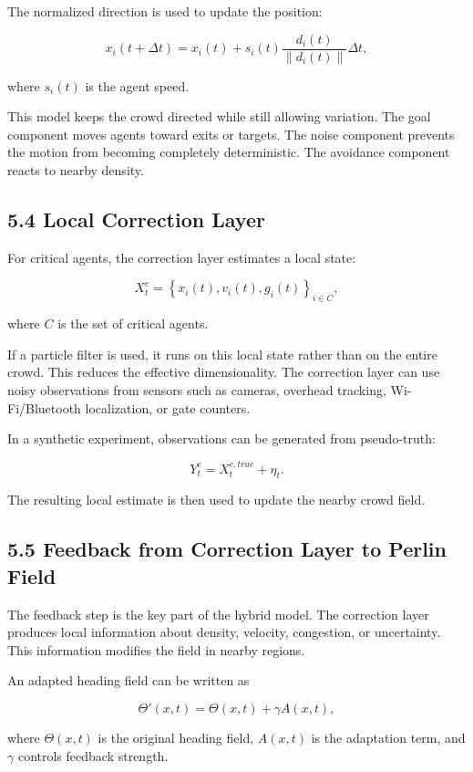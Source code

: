 \documentclass[
  11pt,
]{article}
\begin{document}
The normalized direction is used to update the position:

\[
x_i(t+\Delta t)
=
x_i(t)
+
s_i(t)
\frac{d_i(t)}{\|d_i(t)\|}
\Delta t,
\]

where \(s_i(t)\) is the agent speed.

This model keeps the crowd directed while still allowing variation. The
goal component moves agents toward exits or targets. The noise component
prevents the motion from becoming completely deterministic. The
avoidance component reacts to nearby density.

\subsection{5.4 Local Correction Layer}\label{local-correction-layer}

For critical agents, the correction layer estimates a local state:

\[
X_t^c =
\left\{x_i(t), v_i(t), g_i(t)\right\}_{i \in C},
\]

where \(C\) is the set of critical agents.

If a particle filter is used, it runs on this local state rather than on
the entire crowd. This reduces the effective dimensionality. The
correction layer can use noisy observations from sensors such as
cameras, overhead tracking, Wi-Fi/Bluetooth localization, or gate
counters.

In a synthetic experiment, observations can be generated from
pseudo-truth:

\[
Y_t^c = X_t^{c,true} + \eta_t.
\]

The resulting local estimate is then used to update the nearby crowd
field.

\subsection{5.5 Feedback from Correction Layer to Perlin
Field}\label{feedback-from-correction-layer-to-perlin-field}

The feedback step is the key part of the hybrid model. The correction
layer produces local information about density, velocity, congestion, or
uncertainty. This information modifies the field in nearby regions.

An adapted heading field can be written as

\[
\Theta'(x,t)
=
\Theta(x,t)
+
\gamma A(x,t),
\]

where \(\Theta(x,t)\) is the original heading field, \(A(x,t)\) is the
adaptation term, and \(\gamma\) controls feedback strength.
\end{document}
